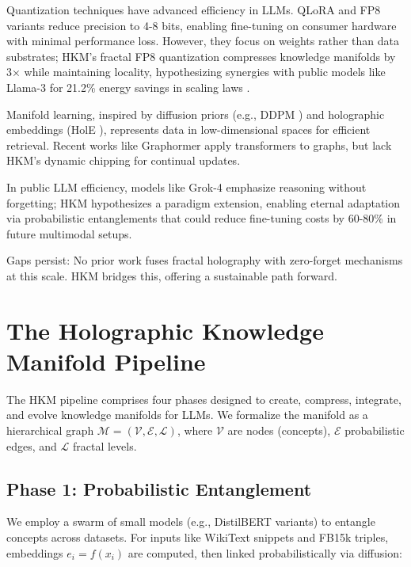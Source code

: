 \documentclass[12pt,a4paper]{article}
\begin{document}
Quantization techniques have advanced efficiency in LLMs. QLoRA \cite{dettmers2023qlora} and FP8 variants \cite{xiao2022fp8,micikevicius2022fp8} reduce precision to 4-8 bits, enabling fine-tuning on consumer hardware with minimal performance loss. However, they focus on weights rather than data substrates; HKM's fractal FP8 quantization compresses knowledge manifolds by 3× while maintaining locality, hypothesizing synergies with public models like Llama-3 \cite{meta2024llama3} for 21.2\% energy savings in scaling laws \cite{openai2020scaling}.

Manifold learning, inspired by diffusion priors (e.g., DDPM \cite{sohl2015deep}) and holographic embeddings (HolE \cite{nickel2016holographic}), represents data in low-dimensional spaces for efficient retrieval. Recent works like Graphormer apply transformers to graphs, but lack HKM's dynamic chipping for continual updates.

In public LLM efficiency, models like Grok-4 \cite{xai2025grok4} emphasize reasoning without forgetting; HKM hypothesizes a paradigm extension, enabling eternal adaptation via probabilistic entanglements that could reduce fine-tuning costs by 60-80\% in future multimodal setups.

Gaps persist: No prior work fuses fractal holography with zero-forget mechanisms at this scale. HKM bridges this, offering a sustainable path forward.

\section{The Holographic Knowledge Manifold Pipeline}

The HKM pipeline comprises four phases designed to create, compress, integrate, and evolve knowledge manifolds for LLMs. We formalize the manifold as a hierarchical graph $\mathcal{M} = (\mathcal{V}, \mathcal{E}, \mathcal{L})$, where $\mathcal{V}$ are nodes (concepts), $\mathcal{E}$ probabilistic edges, and $\mathcal{L}$ fractal levels.

\subsection{Phase 1: Probabilistic Entanglement}

We employ a swarm of small models (e.g., DistilBERT variants) to entangle concepts across datasets. For inputs like WikiText snippets and FB15k triples, embeddings $e_i = f(x_i)$ are computed, then linked probabilistically via diffusion:
\end{document}
